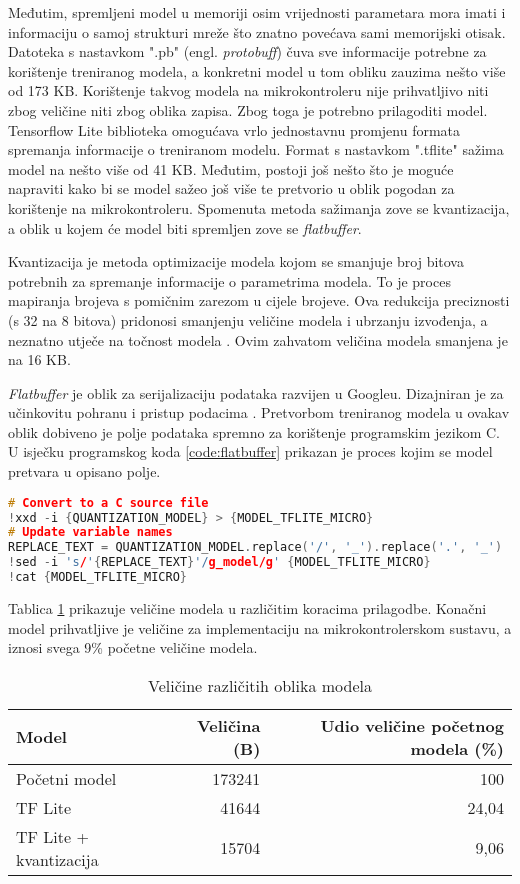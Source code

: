 Međutim, spremljeni model u memoriji osim vrijednosti parametara mora imati i informaciju 
o samoj strukturi mreže što znatno povećava sami memorijski otisak. Datoteka s nastavkom
".pb" (engl. \textit{protobuff}) čuva sve informacije potrebne za korištenje treniranog modela,
a konkretni model u tom obliku zauzima nešto više od 173 KB. Korištenje takvog modela
na mikrokontroleru nije prihvatljivo niti zbog veličine niti zbog oblika zapisa. Zbog 
toga je potrebno prilagoditi model. Tensorflow Lite biblioteka omogućava vrlo jednostavnu
promjenu formata spremanja informacije o treniranom modelu. Format s nastavkom ".tflite"
sažima model na nešto više od 41 KB. Međutim, postoji još nešto što je moguće napraviti
kako bi se model sažeo još više te pretvorio u oblik pogodan za korištenje na
mikrokontroleru. Spomenuta metoda sažimanja zove se kvantizacija, a oblik u kojem će model
biti spremljen zove se \textit{flatbuffer}.

Kvantizacija je metoda optimizacije modela kojom se smanjuje broj bitova potrebnih za
spremanje informacije o parametrima modela. 
To je proces mapiranja brojeva s pomičnim zarezom u cijele brojeve.
Ova redukcija preciznosti (s 32 na 8 bitova)
pridonosi smanjenju veličine modela i ubrzanju izvođenja, a neznatno utječe na točnost
modela \cite{quantization}. Ovim zahvatom veličina modela smanjena je na 16 KB. 

\textit{Flatbuffer} je oblik za serijalizaciju podataka razvijen u Googleu. Dizajniran je
za učinkovitu pohranu i pristup podacima \cite{flatbuffers_docs}. 
Pretvorbom treniranog modela u ovakav oblik
dobiveno je polje podataka spremno za korištenje programskim jezikom C.
U isječku programskog koda \ref{code:flatbuffer} prikazan je proces kojim se model pretvara u opisano 
polje.

\begin{lstlisting}[language=C++, caption=Pretvorba u Flatbuffer, label=code:flatbuffer]
# Convert to a C source file
!xxd -i {QUANTIZATION_MODEL} > {MODEL_TFLITE_MICRO}
# Update variable names
REPLACE_TEXT = QUANTIZATION_MODEL.replace('/', '_').replace('.', '_')
!sed -i 's/'{REPLACE_TEXT}'/g_model/g' {MODEL_TFLITE_MICRO}
!cat {MODEL_TFLITE_MICRO}
\end{lstlisting}

Tablica \ref{tab:model_sizes} prikazuje veličine modela u različitim koracima prilagodbe.
Konačni model prihvatljive je veličine za implementaciju na mikrokontrolerskom sustavu, 
a iznosi svega 9\% početne veličine modela.

\begin{table}[htb]
    \centering
    \begin{tabular}{|l|r|r|}
        \hline
        \textbf{Model} & \textbf{Veličina (B)} & \textbf{Udio veličine početnog modela (\%)} \\ \hline
        Početni model & 173241 & 100 \\ \hline
        TF Lite & 41644 & 24,04 \\ \hline
        TF Lite + kvantizacija & 15704 & 9,06 \\ \hline
    \end{tabular}
    \caption{Veličine različitih oblika modela}
    \label{tab:model_sizes}
\end{table}
